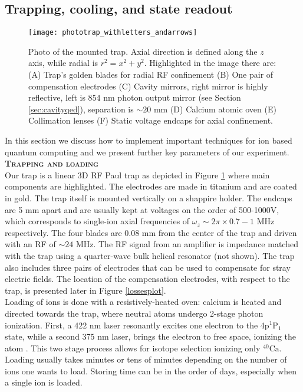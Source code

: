 \subsection{Trapping, cooling, and state readout}
\label{sec:expparameters}
\begin{figure}
\centering
\texttt{[image: phototrap\_withletters\_andarrows]}
\caption{Photo of the mounted trap. Axial direction is defined along the $z$ axis, while radial is $r^2 = x^2 + y^2$. Highlighted in the image there are: (A) Trap's golden blades for radial RF confinement (B) One pair of compensation electrodes (C) Cavity mirrors, right mirror is highly reflective, left is 854 nm photon output mirror (see Section \ref{sec:cavityqed}), separation is $\sim 20$ mm (D) Calcium atomic oven (E) Collimation lenses (F) Static voltage endcaps for axial confinement.}
\label{trapphoto}
\end{figure}
In this section we discuss how to implement important techniques for ion based quantum computing and we present further key parameters of our experiment.\vspace{.5em}\\
\textbf{\textsc{Trapping and loading}}\\
Our trap is a linear 3D RF Paul trap as depicted in Figure \ref{trapphoto} where main components are highlighted. The electrodes are made in titanium and are coated in gold. The trap itself is mounted vertically on a shappire holder. The endcaps are 5 mm apart and are usually kept at voltages on the order of 500-1000V, which corresponds to single-ion axial frequencies of $\omega_z \sim 2\pi \times 0.7-1$ MHz respectively. The four blades are 0.08 mm from the center of the trap and driven with an RF of $\sim 24$ MHz. The RF signal from an amplifier is impedance matched with the trap using a quarter-wave bulk helical resonator (not shown). The trap also includes three pairs of electrodes that can be used to compensate for stray electric fields. The location of the compensation electrodes, with respect to the trap, is presented later in Figure \ref{lossesplot}.\\
Loading of ions is done with a resistively-heated oven: calcium is heated and directed towards the trap, where neutral atoms undergo 2-stage photon ionization. First, a 422 nm laser resonantly excites one electron to the 4p$^1\text{P}_1$ state, while a second 375 nm laser, brings the electron to free space, ionizing the atom \cite{Gulde2001}. This two stage process allows for isotope selection ionizing only $^{40}\text{Ca}$. Loading usually takes minutes or tens of minutes depending on the number of ions one wants to load. Storing time can be in the order of days, especially when a single ion is loaded.\vspace{.5em}\\
